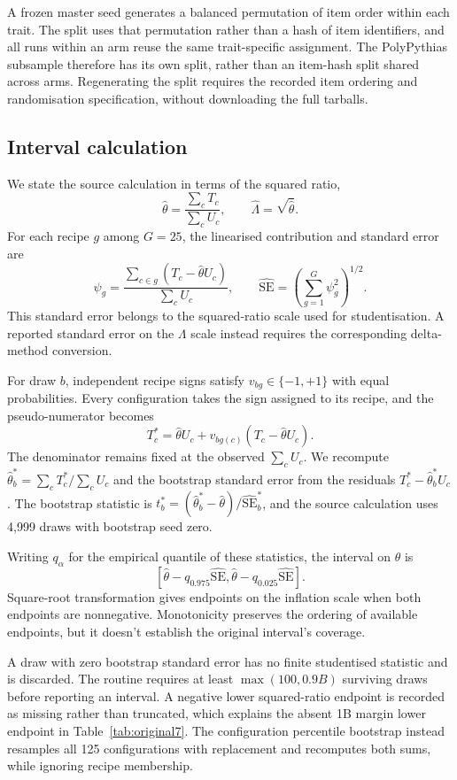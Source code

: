 A frozen master seed generates a balanced permutation of item order within each trait. The split uses that permutation rather than a hash of item identifiers, and all runs within an arm reuse the same trait-specific assignment. The PolyPythias subsample therefore has its own split, rather than an item-hash split shared across arms. Regenerating the split requires the recorded item ordering and randomisation specification, without downloading the full tarballs.

\subsection{Interval calculation}
We state the source calculation in terms of the squared ratio,
\[
\widehat\theta=\frac{\sum_cT_c}{\sum_cU_c},\qquad
\widehat\Lambda=\sqrt{\widehat\theta}.
\]
For each recipe $g$ among $G=25$, the linearised contribution and standard error are
\begin{equation}
\psi_g=\frac{\sum_{c\in g}(T_c-\widehat\theta U_c)}{\sum_cU_c},
\qquad
\widehat{\mathrm{SE}}=\left(\sum_{g=1}^{G}\psi_g^2\right)^{1/2}.
\label{eq:bootstrap}
\end{equation}
This standard error belongs to the squared-ratio scale used for studentisation. A reported standard error on the $\Lambda$ scale instead requires the corresponding delta-method conversion.

For draw $b$, independent recipe signs satisfy $v_{bg}\in\{-1,+1\}$ with equal probabilities. Every configuration takes the sign assigned to its recipe, and the pseudo-numerator becomes
\[
T_c^*=\widehat\theta U_c+v_{bg(c)}(T_c-\widehat\theta U_c).
\]
The denominator remains fixed at the observed $\sum_cU_c$. We recompute $\widehat\theta_b^*=\sum_cT_c^*/\sum_cU_c$ and the bootstrap standard error from the residuals $T_c^*-\widehat\theta_b^*U_c$. The bootstrap statistic is $t_b^*=(\widehat\theta_b^*-\widehat\theta)/\widehat{\mathrm{SE}}_b^*$, and the source calculation uses 4,999 draws with bootstrap seed zero.

Writing $q_\alpha$ for the empirical quantile of these statistics, the interval on $\theta$ is
\[
\left[\widehat\theta-q_{0.975}\widehat{\mathrm{SE}},
\widehat\theta-q_{0.025}\widehat{\mathrm{SE}}\right].
\]
Square-root transformation gives endpoints on the inflation scale when both endpoints are nonnegative. Monotonicity preserves the ordering of available endpoints, but it doesn't establish the original interval's coverage.

A draw with zero bootstrap standard error has no finite studentised statistic and is discarded. The routine requires at least $\max(100,0.9B)$ surviving draws before reporting an interval. A negative lower squared-ratio endpoint is recorded as missing rather than truncated, which explains the absent 1B margin lower endpoint in Table~\ref{tab:original7}. The configuration percentile bootstrap instead resamples all 125 configurations with replacement and recomputes both sums, while ignoring recipe membership.

